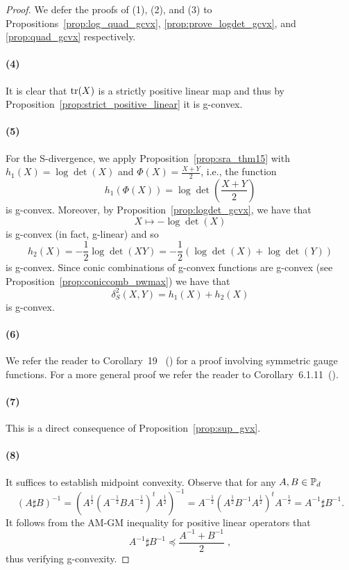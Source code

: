 \documentclass[twoside,11pt]{article}
\begin{document}
\begin{proof}
    We defer the proofs of (1), (2), and (3) to Propositions~\ref{prop:log_quad_gcvx}, \ref{prop:prove_logdet_gcvx}, and \ref{prop:quad_gcvx} respectively.
    \paragraph{(4)} It is clear that $\text{tr}(X)$ is a strictly positive linear map and thus by Proposition~\ref{prop:strict_positive_linear} it is g-convex.
    \paragraph{(5)} For the S-divergence, we apply Proposition~\ref{prop:sra_thm15} with $h_1(X) = \log \det(X)$ and $\Phi(X) = \frac{X+Y}{2}$, i.e., the function 
    \[
    h_1(\Phi(X)) = \log \det \left(\frac{X+Y}{2}\right)
    \]
    is g-convex. Moreover, by Proposition~\ref{prop:logdet_gcvx}, we have that 
    \[
    X \mapsto -\log \det(X)
    \]
    is g-convex (in fact, g-linear) and so 
    \[
    h_2(X) = -\frac{1}{2}\log\det(XY) = - \frac{1}{2}\left(\log \det(X) + \log \det(Y)\right)
    \]
    is g-convex. Since conic combinations of g-convex functions are g-convex (see Proposition~\ref{prop:coniccomb_pwmax}) we have that
    \[
    \delta_S^2(X,Y) = h_1(X) + h_2(X) 
    \]
    is g-convex.
    \paragraph{(6)} We refer the reader to Corollary~19~ (\citep{sra2015conic}) for a proof involving symmetric gauge functions. For a more general proof we refer the reader to Corollary~6.1.11~(\citep{bhatia_psd}).
    \paragraph{(7)} This is a direct consequence of Proposition~\ref{prop:sup_gvx}.
    \paragraph{(8)} It suffices to establish midpoint convexity. Observe that for any $A,B \in \mathbb{P}_d$ 
    \[
    \left(A \sharp B\right)^{-1} = \left( A^{\frac{1}{2}} \left(A^{-\frac{1}{2}} B A^{-\frac{1}{2}} \right)^t A^{\frac{1}{2}}  \right)^{-1} = A^{-\frac{1}{2}} \left(A^{\frac{1}{2}} B^{-1} A^{\frac{1}{2}} \right)^t A^{-\frac{1}{2}} = A^{-1} \sharp B^{-1}.
    \]
    It follows from the AM-GM inequality for positive linear operators that 
    \[
    A^{-1} \sharp B^{-1} \preceq \frac{A^{-1} + B^{-1}}{2} \; ,
    \]
    thus verifying g-convexity. 
\end{proof}
\end{document}
